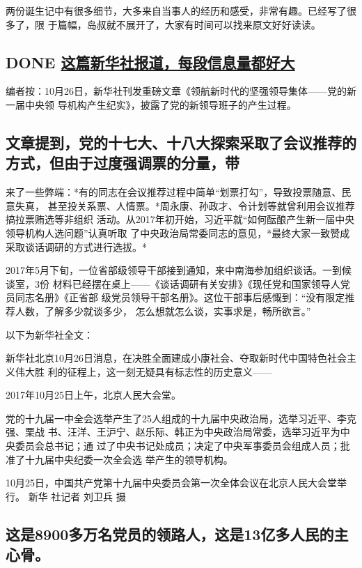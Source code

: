 \documentclass[11pt]{ctexart}
\begin{document}
{{{{两份诞生记中有很多细节，大多来自当事人的经历和感受，非常有趣。已经写了很多了，限
于篇幅，岛叔就不展开了，大家有时间可以找来原文好好读读。

\subsection{{\bfseries\sffamily DONE} \href{https://mp.weixin.qq.com/s?\_\_biz=MjM5MDIwODkyMA==\&mid=2649730116\&idx=1\&sn=dd8919eb9459463c3dfa10b25db2a9c7\&chksm=be534ab38924c3a5b8fbe520293c36a1a4f47752a23e5be835d87c7ba8ed10ab03a51c561e08\#rd}{这篇新华社报道，每段信息量都好大}}
\label{sec:orgc13d25d}
编者按：10月26日，新华社刊发重磅文章《领航新时代的坚强领导集体——党的新一届中央领
导机构产生纪实》，披露了党的新领导班子的产生过程。

\subsection{文章提到，党的十七大、十八大探索采取了会议推荐的方式，但由于过度强调票的分量，带}
\label{sec:org8813259}
来了一些弊端：*有的同志在会议推荐过程中简单“划票打勾”，导致投票随意、民意失真，
甚至投关系票、人情票。*周永康、孙政才、令计划等就曾利用会议推荐搞拉票贿选等非组织
活动。从2017年初开始，习近平就“如何酝酿产生新一届中央领导机构人选问题”认真听取
了中央政治局常委同志的意见，*最终大家一致赞成采取谈话调研的方式进行选拔。*

2017年5月下旬，一位省部级领导干部接到通知，来中南海参加组织谈话。一到候谈室，3份
材料已经摆在桌上——《谈话调研有关安排》《现任党和国家领导人党员同志名册》《正省部
级党员领导干部名册》。这位干部事后感慨到：“没有限定推荐人数，了解多少就谈多少，
怎么想就怎么谈，实事求是，畅所欲言。”

以下为新华社全文：

新华社北京10月26日消息，在决胜全面建成小康社会、夺取新时代中国特色社会主义伟大胜
利的征程上，这一刻无疑具有标志性的历史意义——

2017年10月25日上午，北京人民大会堂。

党的十九届一中全会选举产生了25人组成的十九届中央政治局，选举习近平、李克强、栗战
书、汪洋、王沪宁、赵乐际、韩正为中央政治局常委，选举习近平为中央委员会总书记；通
过了中央书记处成员；决定了中央军事委员会组成人员；批准了十九届中央纪委一次全会选
举产生的领导机构。


10月25日，中国共产党第十九届中央委员会第一次全体会议在北京人民大会堂举行。 新华
社记者 刘卫兵 摄

\subsection{这是8900多万名党员的领路人，这是13亿多人民的主心骨。}
\label{sec:orgb4dc052}

}}}}
\end{document}
